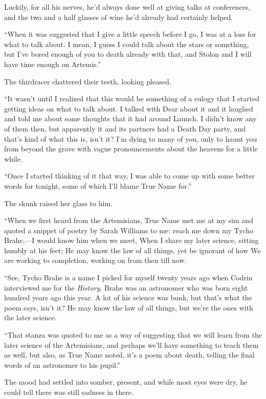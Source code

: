 Luckily, for all his nerves, he'd always done well at giving talks at conferences, and the two and a half glasses of wine he'd already had certainly helped.

``When it was suggested that I give a little speech before I go, I was at a loss for what to talk about. I mean, I guess I could talk about the stars or something, but I've bored enough of you to death already with that, and Stolon and I will have time enough on Artemis.''

The thirdracer chattered their teeth, looking pleased.

``It wasn't until I realized that this would be something of a eulogy that I started getting ideas on what to talk about. I talked with Dear about it and it laughed and told me about some thoughts that it had around Launch. I didn't know any of them then, but apparently it and its partners had a Death Day party, and that's kind of what this is, isn't it? I'm dying to many of you, only to haunt you from beyond the grave with vague pronouncements about the heavens for a little while.

``Once I started thinking of it that way, I was able to come up with some better words for tonight, some of which I'll blame True Name for.''

The skunk raised her glass to him.

``When we first heard from the Artemisians, True Name met me at my sim and quoted a snippet of poetry by Sarah Williams to me: reach me down my Tycho Brahe,—I would know him when we meet, When I share my later science, sitting humbly at his feet; He may know the law of all things, yet be ignorant of how We are working to completion, working on from then till now.

``See, Tycho Brahe is a name I picked for myself twenty years ago when Codrin interviewed me for the \emph{History}. Brahe was an astronomer who was born eight hundred years ago this year. A lot of his science was bunk, but that's what the poem says, isn't it? He may know the law of all things, but we're the ones with the later science.

``That stanza was quoted to me as a way of suggesting that we will learn from the later science of the Artemisians, and perhaps we'll have something to teach them as well, but also, as True Name noted, it's a poem about death, telling the final words of an astronomer to his pupil.''

The mood had settled into somber, present, and while most eyes were dry, he could tell there was still sadness in there.

